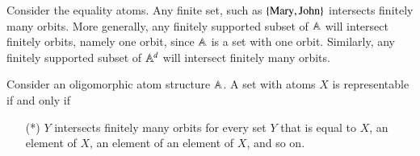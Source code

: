 \begin{myexample}\label{ex:intersects-finitely-many-orbits}
	Consider the equality atoms. Any finite set, such as $\{\text{Mary}, \text{John}\}$ intersects finitely many orbits. More generally, any finitely supported subset of $\mathbb A$ will intersect finitely orbits, namely one orbit, since $\mathbb A$ is a set with one orbit. Similarly, any finitely supported subset of $\mathbb A^d$ will intersect finitely many orbits.
\end{myexample}





\begin{theorem}\label{thm:hof-is-set-builder}
	Consider an oligomorphic atom structure $\mathbb A$. A set with atoms $X$ is representable  if and only if
	\begin{enumerate}
		\item[(*)] $Y$ intersects finitely many orbits for every set $Y$ that is equal to $X$, an element of $X$, an element of an element of $X$, and so on.
	\end{enumerate}
\end{theorem}
